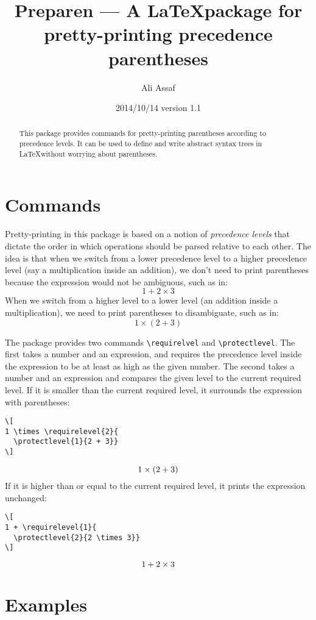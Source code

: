 \documentclass{article}
\title{Preparen --- A \LaTeX package for pretty-printing precedence parentheses}
\author{Ali Assaf}
\date{2014/10/14 version 1.1}
\begin{document}
\maketitle

\begin{abstract}
This package provides commands for pretty-printing parentheses according to 
precedence levels. It can be used to define and write abstract syntax trees in
\LaTeX without worrying about parentheses.
\end{abstract}

\section{Commands}

Pretty-printing in this package is based on a notion of \emph{precedence
levels} that dictate the order in which operations should be parsed relative
to each other.
The idea is that when we switch from a lower precedence level to a higher
precedence level (say a multiplication inside an addition), we don't need to
print parentheses because the expression would not be ambiguous, such as in:
\[
1 + 2 \times 3
\]
When we switch from a higher level to a lower level (an addition inside a
multiplication), we need to print parentheses to disambiguate, such as in:
\[
1 \times \left(2 + 3\right)
\]

The package provides two commands \verb|\requirelvel| and \verb|\protectlevel|.
The first takes a number and an expression, and requires the precedence level
inside the expression to be at least as high as the given number. The second
takes a number and an expression and compares the given level to the current
required level. If it is smaller than the current required level, it surrounds
the expression with parentheses:
\begin{verbatim}
\[
1 \times \requirelevel{2}{
  \protectlevel{1}{2 + 3}}
\]
\end{verbatim}
\[
1 \times \requirelevel{2}{
  \protectlevel{1}{2 + 3}}
\]
If it is higher than or equal to the current required level, it prints the
expression unchanged:
\begin{verbatim}
\[
1 + \requirelevel{1}{
  \protectlevel{2}{2 \times 3}}
\]
\end{verbatim}
\[
1 + \requirelevel{1}{
  \protectlevel{2}{2 \times 3}}
\]


\section{Examples}
\end{document}
